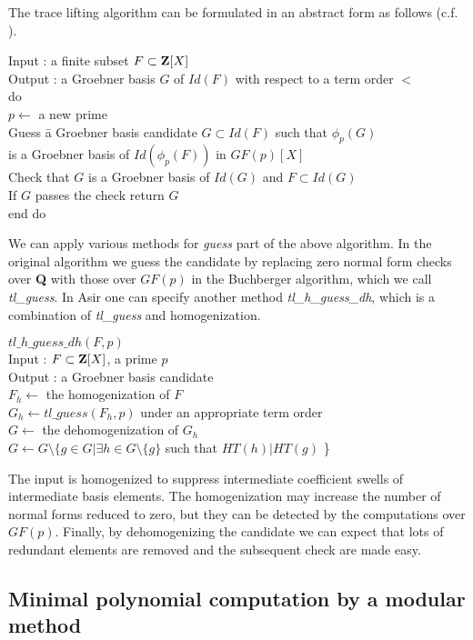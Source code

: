 \documentclass[runningheads]{cl2emult}
\begin{document}
The trace lifting algorithm can be
formulated in an abstract form as follows (c.f. \cite{noro:FPARA}).
\begin{tabbing}
Input : a finite subset $F \subset {\bf Z}[X]$\\
Output : a Groebner basis $G$ of $Id(F)$ with respect to a term order $<$\\
do \= \\
\> $p \leftarrow$ a new prime\\
\>Guess \= a Groebner basis candidate $G \subset Id(F)$ 
such that $\phi_p(G)$ \\
\>\> is a Groebner basis of $Id(\phi_p(F))$ in ${GF(p)}[X]$\\
\>Check that $G$ is a Groebner basis of $Id(G)$ and $F \subset Id(G)$\\
\>If $G$ passes the check return $G$\\
end do
\end{tabbing}
We can apply various methods for {\it guess} part of the above
algorithm.  In the original algorithm we guess the candidate by
replacing zero normal form checks over {\bf Q} with those over $GF(p)$
in the Buchberger algorithm, which we call {\it tl\_guess}. In Asir
one can specify another method {\it tl\_h\_guess\_dh}, which is a
combination of {\it tl\_guess} and homogenization.
\begin{tabbing}
$tl\_h\_guess\_dh(F,p)$\\
Input : $F\subset {\bf Z}[X]$, a prime $p$\\
Output : a Groebner basis candidate\\
$F_h \leftarrow$ the homogenization of $F$\\
$G_h \leftarrow tl\_guess(F_h,p)$ under an appropriate term order\\
$G \leftarrow$ the dehomogenization of $G_h$\\
$G \leftarrow G \setminus \{g \in G| \exists h \in G \setminus \{g\}$
such that $HT(h)|HT(g)$ \}
\end{tabbing}
The input is homogenized to suppress intermediate coefficient swells
of intermediate basis elements.  The homogenization may increase the
number of normal forms reduced to zero, but they can be
detected by the computations over $GF(p)$. Finally, by
dehomogenizing the candidate we can expect that lots of redundant
elements are removed and the subsequent check are made easy.

\subsection{Minimal polynomial computation by a modular method}
\end{document}
